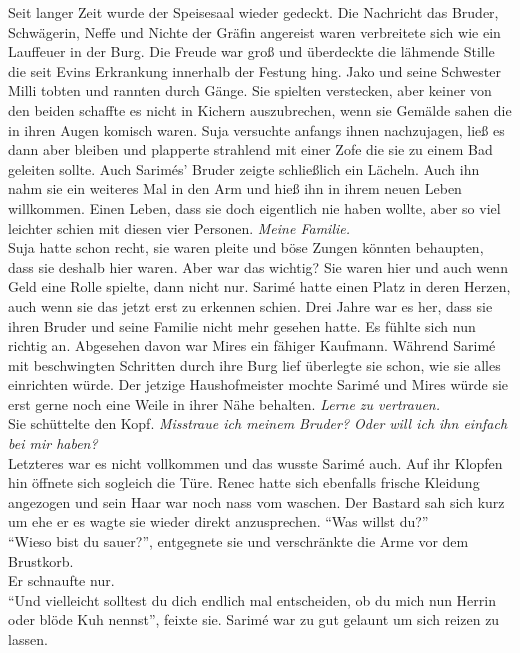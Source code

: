 Seit langer Zeit wurde der Speisesaal wieder gedeckt. Die Nachricht das Bruder, Schwägerin, Neffe 
und Nichte der Gräfin angereist waren verbreitete sich wie ein Lauffeuer in der Burg. Die Freude 
war groß und überdeckte die lähmende Stille die seit Evins Erkrankung innerhalb der Festung hing. 
Jako und seine Schwester Milli tobten und rannten durch Gänge. Sie spielten verstecken, aber keiner 
von den beiden schaffte es nicht in Kichern auszubrechen, wenn sie Gemälde sahen die in ihren Augen 
komisch waren. Suja versuchte anfangs ihnen nachzujagen, ließ es dann aber bleiben und plapperte 
strahlend mit einer Zofe die sie zu einem Bad geleiten sollte. Auch Sarimés' Bruder zeigte 
schließlich ein Lächeln. Auch ihn nahm sie ein weiteres Mal in den Arm und hieß ihn in ihrem neuen 
Leben willkommen. Einen Leben, dass sie doch eigentlich nie haben wollte, aber so viel leichter 
schien mit diesen vier Personen. \textit{Meine Familie.}\\
Suja hatte schon recht, sie waren pleite und böse Zungen könnten behaupten, dass sie deshalb hier 
waren. Aber war das wichtig? Sie waren hier und auch wenn Geld eine Rolle spielte, dann nicht nur. 
Sarimé hatte einen Platz in deren Herzen, auch wenn sie das jetzt erst zu erkennen schien. Drei 
Jahre war es her, dass sie ihren Bruder und seine Familie nicht mehr gesehen hatte. Es fühlte sich 
nun richtig an. Abgesehen davon war Mires ein fähiger Kaufmann. Während Sarimé mit beschwingten 
Schritten durch ihre Burg lief überlegte sie schon, wie sie alles einrichten würde. Der jetzige 
Haushofmeister mochte Sarimé und Mires würde sie erst gerne noch eine Weile in ihrer Nähe behalten.
\textit{Lerne zu vertrauen.}\\
Sie schüttelte den Kopf. \textit{Misstraue ich meinem Bruder? Oder will ich ihn einfach bei mir 
haben?}\\
Letzteres war es nicht vollkommen und das wusste Sarimé auch. Auf ihr Klopfen hin öffnete sich 
sogleich die Türe. Renec hatte sich ebenfalls frische Kleidung angezogen und sein Haar war noch 
nass vom waschen. Der Bastard sah sich kurz um ehe er es wagte sie wieder direkt anzusprechen. 
``Was willst du?''\\
``Wieso bist du sauer?'', entgegnete sie und verschränkte die Arme vor dem Brustkorb. \\
Er schnaufte nur.\\
``Und vielleicht solltest du dich endlich mal entscheiden, ob du mich nun Herrin oder blöde Kuh 
nennst'', feixte sie. Sarimé war zu gut gelaunt um sich reizen zu lassen. \\
